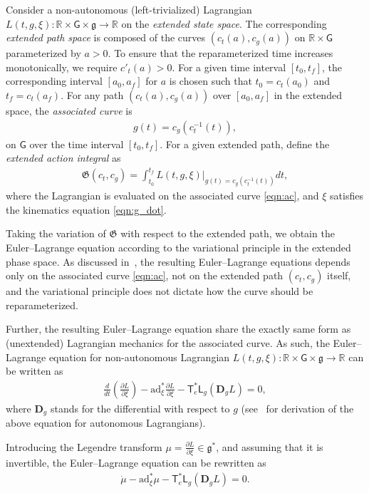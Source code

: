 \documentclass[letterpaper, 10pt, conference]{ieeeconf}
\newcommand{\parenth}[1]{\ensuremath{\left( #1 \right)}}
\newcommand{\deriv}[2]{\ensuremath{\frac{\partial #1}{\partial #2}}}
\newcommand{\G}{\ensuremath{\mathsf{G}}}
\newcommand{\T}{\ensuremath{\mathsf{T}}}
\renewcommand{\L}{\ensuremath{\mathsf{L}}}
\renewcommand{\Re}{\ensuremath{\mathbb{R}}}
\newcommand{\D}{\ensuremath{\mathbf{D}}}
\newcommand{\ad}{\ensuremath{\mathrm{ad}}}
\newcommand{\g}{\ensuremath{\mathfrak{g}}}
\begin{document}
Consider a non-autonomous (left-trivialized) Lagrangian $L(t,g,\xi):\Re\times\G\times\g\rightarrow \Re$ on the \textit{extended state space}.
The corresponding \textit{extended path space} is composed of the curves $(c_t(a),c_g(a))$ on $\Re\times \G$ parameterized by $a>0$.
To ensure that the reparameterized time increases monotonically, we require $c'_t(a) > 0$. 
For a given time interval $[t_0,t_f]$, the corresponding interval $[a_0,a_f]$ for $a$ is chosen such that $t_0=c_t(a_0)$ and $t_f=c_t(a_f)$.
For any path $(c_t(a),c_g(a))$ over $[a_0,a_f]$ in the extended space, the \textit{associated curve} is 
\begin{align}
    g(t) = c_g(c_t^{-1}(t)),\label{eqn:ac}
\end{align}
on $\G$ over the time interval $[t_0,t_f]$.
For a given extended path, define the \textit{extended action integral} as
\begin{align}
    \mathfrak{G}(c_t,c_g) = \int_{t_0}^{t_f} L(t,g,\xi)\bigg|_{g(t) = c_g(c_t^{-1}(t))} dt,\label{eqn:AI}
\end{align}
where the Lagrangian is evaluated on the associated curve \eqref{eqn:ac}, and $\xi$ satisfies the kinematics equation  \eqref{eqn:g_dot}.

Taking the variation of $\mathfrak{G}$ with respect to the extended path, we obtain the Euler--Lagrange equation according to the variational principle in the extended phase space. 
As discussed in~\cite[Sec. 4.2.2]{MarWesAN01}, the resulting Euler--Lagrange equations depends only on the associated curve \eqref{eqn:ac}, not on the extended path $(c_t,c_g)$ itself, and the variational principle does not dictate how the curve should be reparameterized. 

Further, the resulting Euler--Lagrange equation share the exactly same form as (unextended) Lagrangian mechanics for the associated curve. 
As such, the Euler--Lagrange equation for non-autonomous Lagrangian $L(t,g,\xi):\Re\times\G\times\g\rightarrow \Re$ can be written as
\begin{align}
    \frac{d}{dt}\!\parenth{\deriv{L}{\xi}} - \ad^*_\xi \deriv{L}{\xi} - \T^*_e \L_g (\D_g L) = 0, \label{eqn:EL}
\end{align}
where $\D_g$ stands for the differential with respect to $g$ (see~\cite[Sec. 8.6.3]{LeeLeo17} for derivation of the above equation for autonomous Lagrangians).

Introducing the Legendre transform $\mu = \deriv{L}{\xi} \in\g^*$, and assuming that it is invertible, the Euler--Lagrange equation can be rewritten as
\begin{align}
    \dot \mu - \ad^*_{\xi} \mu - \T^*_e \L_g (\D_g L) = 0. \label{eqn:HE}
\end{align}
\end{document}
